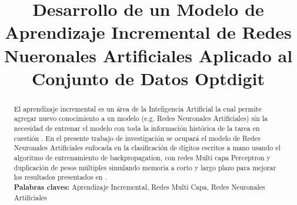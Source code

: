 \documentclass[10pt,a4paper]{article}
\title{Desarrollo de un Modelo de Aprendizaje Incremental de Redes Nueronales Artificiales Aplicado al Conjunto de
Datos Optdigit}
\begin{document}
    
    \tableofcontents
    \listoffigures
    \maketitle
    \begin{abstract}
        El aprendizaje incremental es un área de la Inteligencia Artificial la cual permite agregar nuevo conocimiento 
        a un modelo (e.g. Redes Neuronales Artificiales) sin la necesidad de entrenar el modelo con toda la información 
        histórica de la tarea en cuestión \cite{bullinaria2009}. En el presente trabajo de investigación se ocupará el modelo de Redes 
        Neuronales Artificiales enfocada en la clasificación de dígitos escritos a mano usando el algoritmo de 
        entrenamiento de backpropagation, con redes Multi capa Perceptron y duplicación de pesos múltiples 
        simulando memoria a corto y largo plazo para mejorar los resultados presentados en \cite{bullinaria2009}.\\

        \textbf{Palabras claves:} Aprendizaje Incremental, Redes Multi Capa, Redes Neuronales Artificiales
    \end{abstract}

    
    
    
    
    
    
    
    
    
    
    
    
\end{document}
